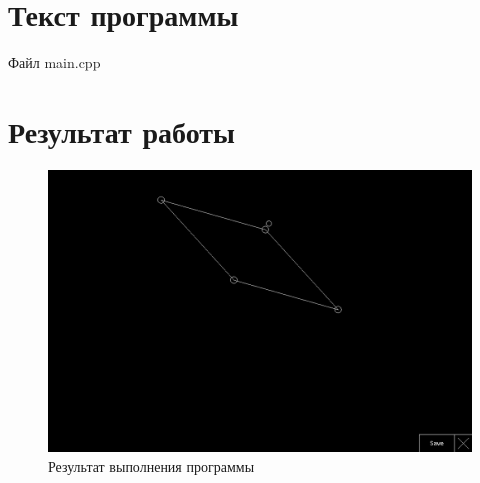 \documentclass[14pt, a4paper]{extreport}
\begin{document}
\chapter{Текст программы}

\noindent Файл main.cpp


\chapter{Результат работы}

\begin{figure}[h!]
	\centering
	\includegraphics[width = 12cm]{image/output}
  \caption{Результат выполнения программы}
\end{figure}


\end{document}
